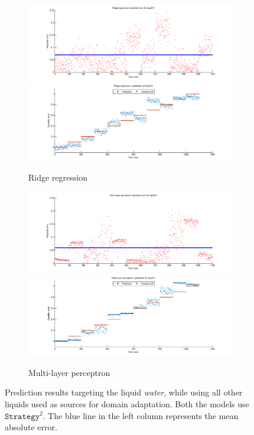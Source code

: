 \documentclass{article} %
\begin{document}
\begin{figure}[htb]
\centering
\begin{subfigure}{\linewidth}
\includegraphics[width=0.49\linewidth]{train1-8_test9_regress.png}
\includegraphics[width=0.49\linewidth]{train1-8_test9_regress_prediction.png}
\caption*{Ridge regression}
\end{subfigure}
\begin{subfigure}{\linewidth}
\includegraphics[width=0.49\linewidth]{train1-8_test9_nn.png}
\includegraphics[width=0.49\linewidth]{train1-8_test9_nn_prediction.png}
\caption*{Multi-layer perceptron}
\end{subfigure}
\caption{Prediction results targeting the liquid {\em water}, while using all other liquids used as sources for domain adaptation. Both the models use $\mathtt{Strategy}^2$. The blue line in the left column represents the mean absolute error.}
\label{fig:water}
\end{figure}
\end{document}
